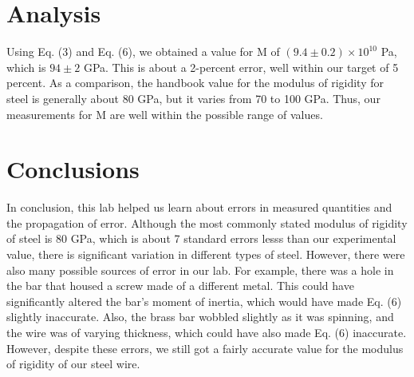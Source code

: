 \documentclass[leqno]{article}
\begin{document}
\section*{Analysis}
Using Eq. (3) and Eq. (6), we obtained a value for M of $(9.4\pm0.2)\times10^{10}$ Pa, which is $94\pm2$ GPa.  This is about a 2-percent error, well within our target of 5 percent.  As a comparison, the handbook value for the modulus of rigidity for steel is generally about 80 GPa, but it varies from 70 to 100 GPa.  Thus, our measurements for M are well within the possible range of values.
\section*{Conclusions}
In conclusion, this lab helped us learn about errors in measured quantities and the propagation of error.  Although the most commonly stated modulus of rigidity of steel is 80 GPa, which is about 7 standard errors lesss than our experimental value, there is significant variation in different types of steel. However, there were also many possible sources of error in our lab.  For example, there was a hole in the bar that housed a screw made of a different metal.  This could have significantly altered the bar's moment of inertia, which would have made Eq. (6) slightly inaccurate.  Also, the brass bar wobbled slightly as it was spinning, and the wire was of varying thickness, which could have also made Eq. (6) inaccurate.  However, despite these errors, we still got a fairly accurate value for the modulus of rigidity of our steel wire.
\newpage
\end{document}
